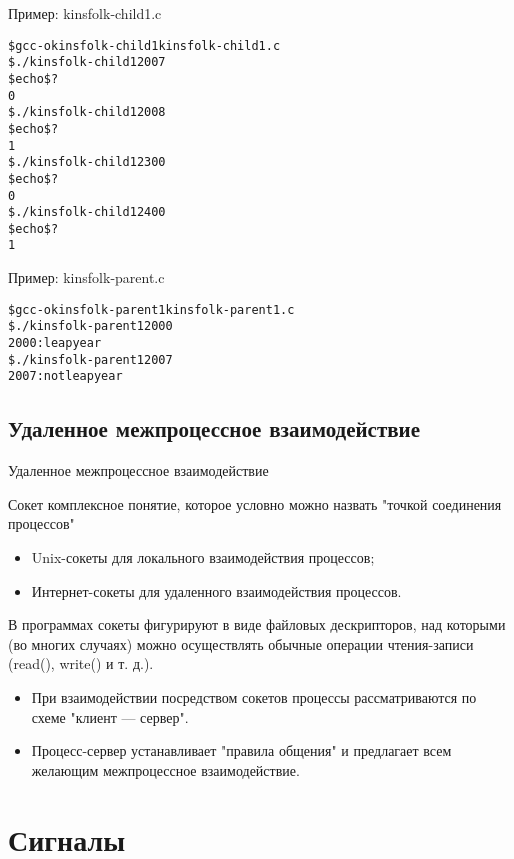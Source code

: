 \documentclass{beamer}
\begin{document}
\begin{frame}[fragile]{Пример: kinsfolk-child1.c}
\begin{alltt}
\$ gcc -o kinsfolk-child1 kinsfolk-child1.c
\$ ./kinsfolk-child1 2007
\$ echo \$?
0
\$ ./kinsfolk-child1 2008
\$ echo \$?
1
\$ ./kinsfolk-child1 2300
\$ echo \$?
0
\$ ./kinsfolk-child1 2400
\$ echo \$?
1
\end{alltt}
\end{frame}

\begin{frame}[fragile]{Пример: kinsfolk-parent.c}
\begin{alltt}
\$ gcc -o kinsfolk-parent1 kinsfolk-parent1.c
\$ ./kinsfolk-parent1 2000
2000: leap year
\$ ./kinsfolk-parent1 2007
2007: not leap year
\end{alltt}
\end{frame}

\subsection{Удаленное межпроцессное взаимодействие}

\begin{frame}{Удаленное межпроцессное взаимодействие}
\begin{block}{Сокет}
комплексное понятие, которое условно можно назвать "точкой соединения процессов"
\end{block}
\begin{itemize}
\item Unix-сокеты для локального взаимодействия процессов;
\item Интернет-сокеты для удаленного взаимодействия процессов.
\end{itemize}
В программах сокеты фигурируют в виде файловых дескрипторов, над которыми (во многих случаях) можно осуществлять обычные операции чтения-записи (read(), write() и т. д.). 
\begin{itemize}
\item При взаимодействии посредством сокетов процессы рассматриваются по схеме "клиент — сервер".
\item Процесс-сервер устанавливает "правила общения" и предлагает всем желающим межпроцессное взаимодействие. 
\end{itemize}
\end{frame}

\section{Сигналы}
\end{document}
